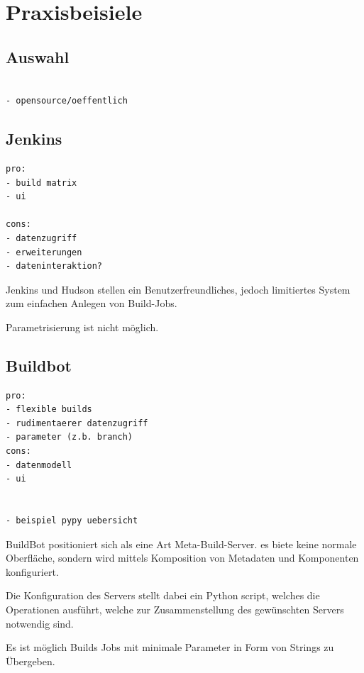 \section{Praxisbeisiele}

\subsection{Auswahl}

\begin{verbatim}

- opensource/oeffentlich
\end{verbatim}

\subsection{Jenkins}

\begin{verbatim}
pro:
- build matrix
- ui

cons:
- datenzugriff
- erweiterungen
- dateninteraktion?

\end{verbatim}

Jenkins und Hudson stellen ein Benutzerfreundliches,
jedoch limitiertes System zum einfachen Anlegen von Build-Jobs.

Parametrisierung ist nicht möglich.

\subsection{Buildbot}


\begin{verbatim}
pro:
- flexible builds
- rudimentaerer datenzugriff
- parameter (z.b. branch)
cons:
- datenmodell
- ui


- beispiel pypy uebersicht

\end{verbatim}


BuildBot positioniert sich als eine Art Meta-Build-Server.
es biete keine normale Oberfläche, sondern wird mittels
Komposition von Metadaten und Komponenten konfiguriert.

Die Konfiguration des Servers stellt dabei ein Python script,
welches die Operationen ausführt, welche zur Zusammenstellung des gewünschten Servers notwendig sind.

Es ist möglich Builds Jobs mit minimale Parameter in Form von Strings zu Übergeben.

